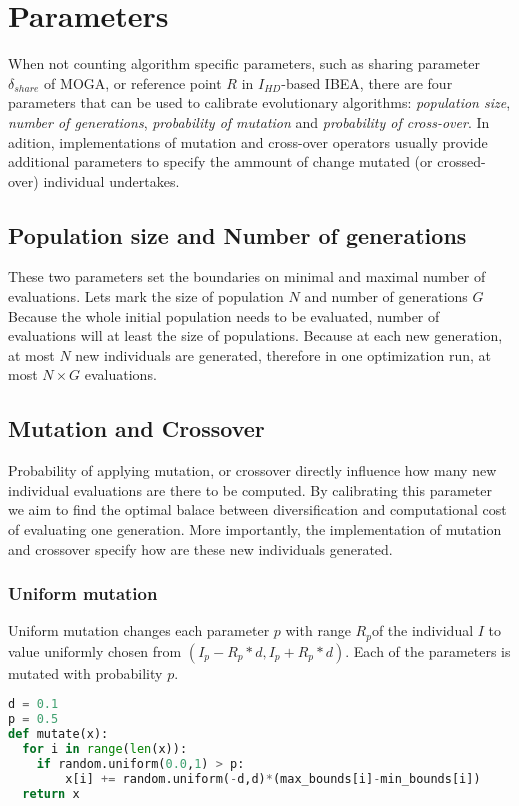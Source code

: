 \documentclass[12pt,oneside]{fithesis2}
\begin{document}
\section{Parameters}

When not counting algorithm specific parameters, such as sharing parameter $\delta_{share}$ of MOGA, or reference point $R$ in $I_{HD}$-based IBEA, there are four parameters that can be used to calibrate evolutionary algorithms: \emph{population size}, \emph{number of generations}, \emph{probability of mutation} and \emph{probability of cross-over}. In adition, implementations of mutation and cross-over operators usually provide additional parameters to specify the ammount of change mutated (or crossed-over) individual undertakes.

\subsection{Population size and Number of generations}
These two parameters set the boundaries on minimal and maximal number of evaluations. Lets mark the size of population $N$ and number of generations $G$ Because the whole initial population needs to be evaluated, number of evaluations will at least the size of populations.
Because at each new generation, at most $N$ new individuals are generated, therefore in one optimization run, at most $N \times G$ evaluations.

\subsection{Mutation and Crossover}
Probability of applying mutation, or crossover directly influence how many new individual evaluations are there to be computed. By calibrating this parameter we aim to find the optimal balace between diversification and computational cost of evaluating one generation. More importantly, the implementation of mutation and crossover specify how are these new individuals generated. 

\subsubsection{Uniform mutation} 
Uniform mutation changes each parameter $p$ with range $R_p$of the individual $I$ to value uniformly chosen from $(I_p - R_p*d,I_p + R_p*d)$. Each of the parameters is mutated with probability $p$.
\begin{lstlisting}[language=Python,label=mutate_example,caption=Uniform mutation example]
d = 0.1
p = 0.5
def mutate(x):
  for i in range(len(x)):
    if random.uniform(0.0,1) > p:
        x[i] += random.uniform(-d,d)*(max_bounds[i]-min_bounds[i])
  return x
\end{lstlisting}
\end{document}
